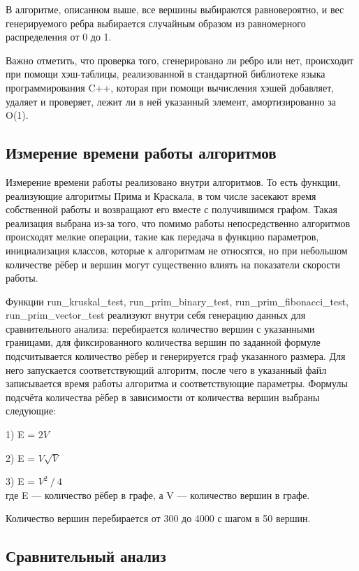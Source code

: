 	В алгоритме, описанном выше, все вершины выбираются равновероятно, и вес генерируемого ребра выбирается случайным образом из равномерного распределения от 0 до 1. 
	
	Важно отметить, что проверка того, сгенерировано ли ребро или нет, происходит при помощи хэш-таблицы, реализованной в стандартной библиотеке языка программирования C++, которая при помощи вычисления хэшей добавляет, удаляет и проверяет, лежит ли в ней указанный элемент, амортизированно за O(1).
	
	\subsection{Измерение времени работы алгоритмов}
	
	\hspace{0.5 cm}
	
	Измерение времени работы реализовано внутри алгоритмов. То есть функции, реализующие алгоритмы Прима и Краскала, в том числе засекают время собственной работы и возвращают его вместе с получившимся графом. Такая реализация выбрана из-за того, что помимо работы непосредственно алгоритмов происходят мелкие операции, такие как передача в функцию параметров, инициализация классов, которые к алгоритмам не относятся, но при небольшом количестве рёбер и вершин могут существенно влиять на показатели скорости работы. 
	
	Функции run\_kruskal\_test, run\_prim\_binary\_test, run\_prim\_fibonacci\_test, \\run\_prim\_vector\_test реализуют внутри себя генерацию данных для сравнительного анализа: перебирается количество вершин с указанными границами, для фиксированного количества вершин по заданной формуле подсчитывается количество рёбер и генерируется граф указанного размера. Для него запускается соответствующий алгоритм, после чего в указанный файл записывается время работы алгоритма и соответствующие параметры. Формулы подсчёта количества рёбер в зависимости от количества вершин выбраны следующие:
	
	1) E = \(2V\)
	
	2) E = \( V\sqrt{V}\)
	
	3) E = \(V^2~/~4\) \\
	где E — количество рёбер в графе, а V — количество вершин в графе.
	
	Количество вершин перебирается от 300 до 4000 с шагом в 50 вершин.
	
	\subsection{Сравнительный анализ}
	
